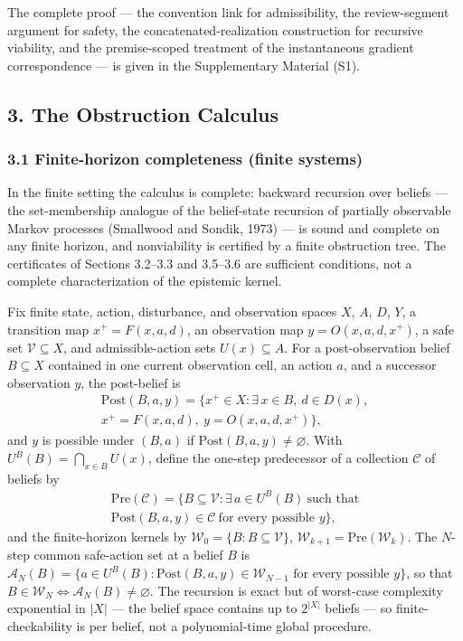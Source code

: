 \documentclass[10pt,twocolumn]{article}
\theoremstyle{definition}
\begin{document}
The complete proof --- the convention link for admissibility, the
review-segment argument for safety, the concatenated-realization
construction for recursive viability, and the premise-scoped treatment
of the instantaneous gradient correspondence --- is given in the
Supplementary Material (S1).


\subsection{3. The Obstruction Calculus}\label{calc-the-obstruction-calculus}

\subsubsection{3.1 Finite-horizon completeness (finite systems)}\label{calc-finite-horizon-completeness}

In the finite setting the calculus is complete: backward recursion over beliefs --- the set-membership analogue of the belief-state recursion of partially observable Markov processes (Smallwood and Sondik, 1973) --- is sound and complete on any finite horizon, and nonviability is certified by a finite obstruction tree. The certificates of Sections 3.2--3.3 and 3.5--3.6 are sufficient conditions, not a complete characterization of the epistemic kernel.

Fix finite state, action, disturbance, and observation spaces \(X\),
\(A\), \(D\), \(Y\), a transition map \(x^+ = F(x,a,d)\), an observation
map \(y = O(x,a,d,x^+)\), a safe set \(\mathcal V\subseteq X\), and
admissible-action sets \(U(x)\subseteq A\). For a post-observation belief \(B\subseteq X\) contained in one
current observation cell, an action \(a\), and a successor observation
\(y\), the post-belief is
\[
\begin{gathered}
\mathrm{Post}(B,a,y) = \bigl\{ x^+\in X : \exists\, x\in B,\ d\in D(x), \\
x^+ = F(x,a,d),\ y = O(x,a,d,x^+) \bigr\},
\end{gathered}
\]
and \(y\) is possible under \((B,a)\) if \(\mathrm{Post}(B,a,y)\neq\varnothing\).
With \(U^B(B)=\bigcap_{x\in B}U(x)\), define the one-step predecessor of a
collection \(\mathcal C\) of beliefs by
\[
\begin{gathered}
\mathrm{Pre}(\mathcal C) = \bigl\{ B\subseteq\mathcal V : \exists\, a\in U^B(B)\ \text{such that}\\
\mathrm{Post}(B,a,y)\in\mathcal C\ \text{for every possible } y \bigr\},
\end{gathered}
\]
and the finite-horizon kernels by \(\mathcal W_0 = \{B : B\subseteq\mathcal V\}\),
\(\mathcal W_{k+1} = \mathrm{Pre}(\mathcal W_k)\).
The \(N\)-step common safe-action set at a belief \(B\) is
\(\mathcal{A}_N(B) = \bigl\{ a \in U^B(B) : \mathrm{Post}(B,a,y) \in \mathcal W_{N-1} \text{ for every possible } y \bigr\}\),
so that \(B \in \mathcal W_N \iff \mathcal{A}_N(B) \neq \varnothing\). The recursion is exact but of worst-case complexity exponential in
\(|X|\) --- the belief space contains up to \(2^{|X|}\) beliefs --- so
finite-checkability is per belief, not a polynomial-time global procedure.
\end{document}
